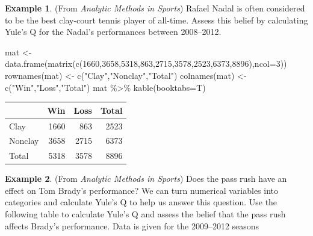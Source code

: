 \documentclass[
  11pt,
]{book}
\newenvironment{Shaded}{\begin{snugshade}}{\end{snugshade}}
\newcommand{\AttributeTok}[1]{\textcolor[rgb]{0.77,0.63,0.00}{#1}}
\newcommand{\DecValTok}[1]{\textcolor[rgb]{0.00,0.00,0.81}{#1}}
\newcommand{\FunctionTok}[1]{\textcolor[rgb]{0.00,0.00,0.00}{#1}}
\newcommand{\NormalTok}[1]{#1}
\newcommand{\OtherTok}[1]{\textcolor[rgb]{0.56,0.35,0.01}{#1}}
\newcommand{\SpecialCharTok}[1]{\textcolor[rgb]{0.00,0.00,0.00}{#1}}
\newcommand{\StringTok}[1]{\textcolor[rgb]{0.31,0.60,0.02}{#1}}
\theoremstyle{definition}
\theoremstyle{definition}
\newtheorem{example}{Example}[chapter]
\theoremstyle{definition}
\theoremstyle{definition}
\theoremstyle{remark}
\begin{document}
\newpage

\begin{example}
(From \emph{Analytic Methods in Sports}) Rafael Nadal is often considered to be the best clay-court tennis player of all-time. Assess this belief by calculating Yule's Q for the Nadal's performances between 2008--2012.
\end{example}

\begin{Shaded}
\begin{Highlighting}[]
\NormalTok{mat }\OtherTok{\textless{}{-}} \FunctionTok{data.frame}\NormalTok{(}\FunctionTok{matrix}\NormalTok{(}\FunctionTok{c}\NormalTok{(}\DecValTok{1660}\NormalTok{,}\DecValTok{3658}\NormalTok{,}\DecValTok{5318}\NormalTok{,}\DecValTok{863}\NormalTok{,}\DecValTok{2715}\NormalTok{,}\DecValTok{3578}\NormalTok{,}\DecValTok{2523}\NormalTok{,}\DecValTok{6373}\NormalTok{,}\DecValTok{8896}\NormalTok{),}\AttributeTok{ncol=}\DecValTok{3}\NormalTok{))}
\FunctionTok{rownames}\NormalTok{(mat) }\OtherTok{\textless{}{-}} \FunctionTok{c}\NormalTok{(}\StringTok{"Clay"}\NormalTok{,}\StringTok{"Nonclay"}\NormalTok{,}\StringTok{"Total"}\NormalTok{)}
\FunctionTok{colnames}\NormalTok{(mat) }\OtherTok{\textless{}{-}} \FunctionTok{c}\NormalTok{(}\StringTok{"Win"}\NormalTok{,}\StringTok{"Loss"}\NormalTok{,}\StringTok{"Total"}\NormalTok{)}
\NormalTok{mat }\SpecialCharTok{\%\textgreater{}\%} \FunctionTok{kable}\NormalTok{(}\AttributeTok{booktabs=}\NormalTok{T)}
\end{Highlighting}
\end{Shaded}

\begin{tabular}{lrrr}
\toprule
  & Win & Loss & Total\\
\midrule
Clay & 1660 & 863 & 2523\\
Nonclay & 3658 & 2715 & 6373\\
Total & 5318 & 3578 & 8896\\
\bottomrule
\end{tabular}

\vfill

\begin{example}
(From \emph{Analytic Methods in Sports}) Does the pass rush have an effect on Tom Brady's performance? We can turn numerical variables into categories and calculate Yule's Q to help us answer this question. Use the following table to calculate Yule's Q and assess the belief that the pass rush affects Brady's performance. Data is given for the 2009--2012 seasons
\end{example}
\end{document}

